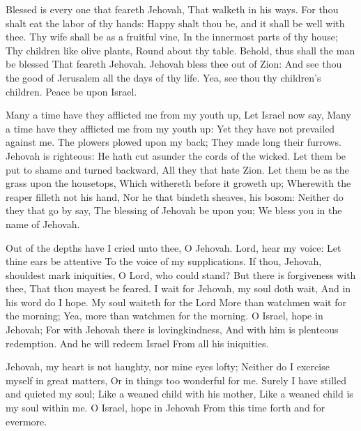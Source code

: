 Blessed is every one that feareth Jehovah, That walketh in his ways.  For thou shalt eat the labor of thy hands: Happy shalt thou be, and it shall be well with thee.  Thy wife shall be as a fruitful vine, In the innermost parts of thy house; Thy children like olive plants, Round about thy table.  Behold, thus shall the man be blessed That feareth Jehovah.  Jehovah bless thee out of Zion: And see thou the good of Jerusalem all the days of thy life.  Yea, see thou thy children’s children. Peace be upon Israel. 

Many a time have they afflicted me from my youth up, Let Israel now say,  Many a time have they afflicted me from my youth up: Yet they have not prevailed against me.  The plowers plowed upon my back; They made long their furrows.  Jehovah is righteous: He hath cut asunder the cords of the wicked.  Let them be put to shame and turned backward, All they that hate Zion.  Let them be as the grass upon the housetops, Which withereth before it groweth up;  Wherewith the reaper filleth not his hand, Nor he that bindeth sheaves, his bosom:  Neither do they that go by say, The blessing of Jehovah be upon you; We bless you in the name of Jehovah. 

Out of the depths have I cried unto thee, O Jehovah.  Lord, hear my voice: Let thine ears be attentive To the voice of my supplications.  If thou, Jehovah, shouldest mark iniquities, O Lord, who could stand?  But there is forgiveness with thee, That thou mayest be feared.  I wait for Jehovah, my soul doth wait, And in his word do I hope.  My soul waiteth for the Lord More than watchmen wait for the morning; Yea, more than watchmen for the morning.  O Israel, hope in Jehovah; For with Jehovah there is lovingkindness, And with him is plenteous redemption.  And he will redeem Israel From all his iniquities. 

Jehovah, my heart is not haughty, nor mine eyes lofty; Neither do I exercise myself in great matters, Or in things too wonderful for me.  Surely I have stilled and quieted my soul; Like a weaned child with his mother, Like a weaned child is my soul within me.  O Israel, hope in Jehovah From this time forth and for evermore. 

